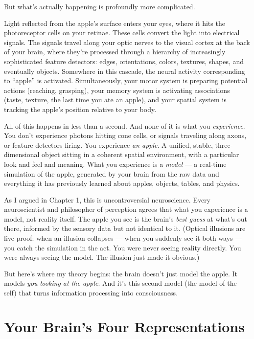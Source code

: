 \documentclass[11pt, twoside, openright]{book}
\begin{document}
But what's actually happening is profoundly more complicated.

Light reflected from the apple's surface enters your eyes, where it hits the photoreceptor cells on your retinae. These cells convert the light into electrical signals. The signals travel along your optic nerves to the visual cortex at the back of your brain, where they're processed through a hierarchy of increasingly sophisticated feature detectors: edges, orientations, colors, textures, shapes, and eventually objects. Somewhere in this cascade, the neural activity corresponding to ``apple'' is activated. Simultaneously, your motor system is preparing potential actions (reaching, grasping), your memory system is activating associations (taste, texture, the last time you ate an apple), and your spatial system is tracking the apple's position relative to your body.

All of this happens in less than a second. And none of it is what you \textit{experience}. You don't experience photons hitting cone cells, or signals traveling along axons, or feature detectors firing. You experience \textit{an apple}. A unified, stable, three-dimensional object sitting in a coherent spatial environment, with a particular look and feel and meaning. What you experience is a \textit{model} --- a real-time simulation of the apple, generated by your brain from the raw data and everything it has previously learned about apples, objects, tables, and physics.

As I argued in Chapter 1, this is uncontroversial neuroscience. Every neuroscientist and philosopher of perception agrees that what you experience is a model, not reality itself. The apple you see is the brain's \textit{best guess} at what's out there, informed by the sensory data but not identical to it. (Optical illusions are live proof: when an illusion collapses --- when you suddenly see it both ways --- you catch the simulation in the act. You were never seeing reality directly. You were always seeing the model. The illusion just made it obvious.)

But here's where my theory begins: the brain doesn't just model the apple. It models \textit{you looking at the apple}. And it's this second model (the model of the self) that turns information processing into consciousness.

\section*{Your Brain's Four Representations}
\end{document}
